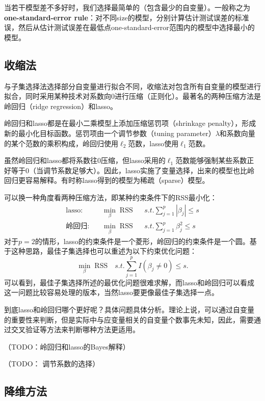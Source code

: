 \documentclass[hyperref,]{ctexart}
\begin{document}
当若干模型差不多好时，我们选择最简单的（包含最少的自变量）。一般称之为\textbf{one-standard-error
rule}：对不同size的模型，分别计算估计测试误差的标准误，然后从估计测试误差在最低点one-standard-error范围内的模型中选择最小的模型。

\subsection{收缩法}

与子集选择法选择部分自变量进行拟合不同，收缩法对包含所有自变量的模型进行拟合，同时采用某种技术对系数向0进行压缩（正则化）。最著名的两种压缩方法是岭回归（ridge
regression）和lasso。

岭回归和lasso都是在最小二乘模型上添加压缩惩罚项（shrinkage
penalty），形成新的最小化目标函数。惩罚项由一个调节参数（tuning
parameter）\(\lambda\)和系数向量的某个范数的乘积构成，岭回归使用\(\ell_2\)范数，lasso使用\(\ell_1\)范数。

虽然岭回归和lasso都将系数往0压缩，但lasso采用的\(\ell_1\)范数能够强制某些系数正好等于0（当调节系数足够大）。因此，lasso实施了变量选择，出来的模型也比岭回归更容易解释。有时称lasso得到的模型为稀疏（sparse）模型。

可以换一种角度看两种压缩方法，即某种约束条件下的RSS最小化： \[
\begin{eqnarray}
\mathrm{lasso:} && \min_\beta \; \mathrm{RSS} && s.t. \sum_{j=1}^p |\beta_j|\leq s \\
\mathrm{岭回归:} && \min_\beta \; \mathrm{RSS} && s.t. \sum_{j=1}^p \beta_j^2\leq s
\end{eqnarray}
\]
对于\(p=2\)的情形，lasso的约束条件是一个菱形，岭回归的约束条件是一个圆。基于这种思路，最佳子集选择也可以重述为以下约束优化问题：
\[\min_\beta \; \mathrm{RSS} \quad s.t. \sum_{j=1}^p I\left(\beta_j\neq 0\right)\leq s.\]
可以看到，最佳子集选择所述的最优化问题很难求解，而lasso和岭回归可以看成这一问题比较容易处理的版本，当然lasso要更像最佳子集选择一点。

到底lasso和岭回归哪个更好呢？具体问题具体分析。理论上说，可以通过自变量的重要性来判断，但是实际中与应变量相关的自变量个数事先未知，因此，需要通过交叉验证等方法来判断哪种方法更适用。

（TODO：岭回归和lasso的Bayes解释）

（TODO： 调节系数的选择）

\subsection{降维方法}
\end{document}
